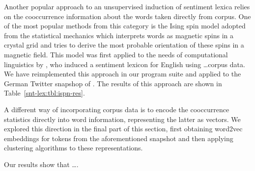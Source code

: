 Another popular approach to an unsupervised induction of sentiment
lexica relies on the cooccurrence information about the words taken
directly from corpus.  One of the most popular methods from this
category is the Ising spin model adopted from the statistical
mechanics which interprets words as magnetic spins in a crystal grid
and tries to derive the most probable orientation of these spins in a
magnetic field.  This model was first applied to the needs of
computational linguistics by \citet{Takamura:05}, who induced a
sentiment lexicon for English using \ldots corpus data.  We have
reimplemented this approach in our program suite and applied to the
German Twitter snapshop of \citet{Scheffler:14}.  The results of this
approach are shown in Table~\ref{snt-lex:tbl:ispn-res}.

A different way of incorporating corpus data is to encode the
cooccurrence statistics directly into word information, representing
the latter as vectors.  We explored this direction in the final part
of this section, first obtaining word2vec embeddings for tokens from
the aforementioned snapshot and then applying clustering algorithms to
these representations.

Our results show that \ldots.

\newpage
